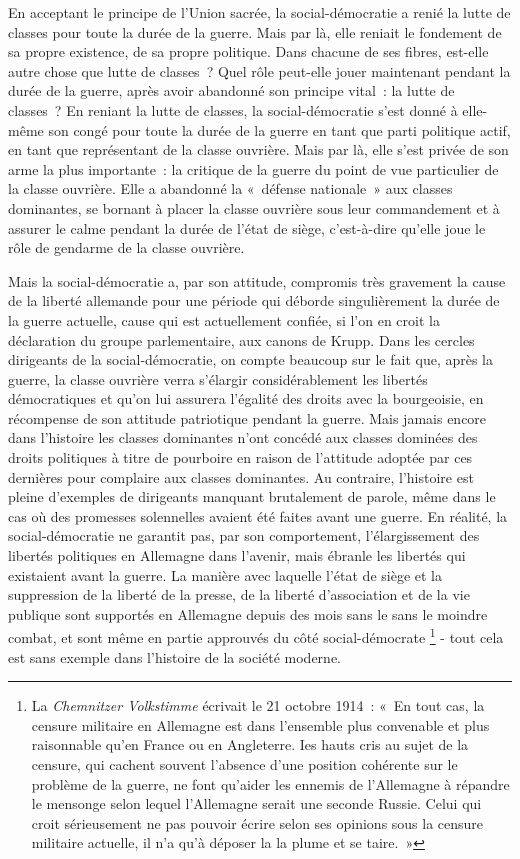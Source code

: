 \documentclass[french,twoside]{book} %
\begin{document}
En acceptant le principe de l’Union sacrée, la social-démocratie a renié la lutte de classes pour toute la durée de la guerre. Mais par là, elle reniait le fondement de sa propre existence, de sa propre politique. Dans chacune de ses fibres, est-elle autre chose que lutte de classes ? Quel rôle peut-elle jouer maintenant pendant la durée de la guerre, après avoir abandonné son principe vital : la lutte de classes ? En reniant la lutte de classes, la social-démocratie s’est donné à elle-même son congé pour toute la durée de la guerre en tant que parti politique actif, en tant que représentant de la classe ouvrière. Mais par là, elle s’est privée de son arme la plus importante : la critique de la guerre du point de vue particulier de la classe ouvrière. Elle a abandonné la « défense nationale » aux classes dominantes, se bornant à placer la classe ouvrière sous leur commandement et à assurer le calme pendant la durée de l’état de siège, c’est-à-dire qu’elle joue le rôle de gendarme de la classe ouvrière.\par
Mais la social-démocratie a, par son attitude, compromis très gravement la cause de la liberté allemande pour une période qui déborde singulièrement la durée de la guerre actuelle, cause qui est actuellement confiée, si l’on en croit la déclaration du groupe parlementaire, aux canons de Krupp. Dans les cercles dirigeants de la social-démocratie, on compte beaucoup sur le fait que, après la guerre, la classe ouvrière verra s’élargir considérablement les libertés démocratiques et qu’on lui assurera l’égalité des droits avec la bourgeoisie, en récompense de son attitude patriotique pendant la guerre. Mais jamais encore dans l’histoire les classes dominantes n’ont concédé aux classes dominées des droits politiques à titre de pourboire en raison de l’attitude adoptée par ces dernières pour complaire aux classes dominantes. Au contraire, l’histoire est pleine d’exemples de dirigeants manquant brutalement de parole, même dans le cas où des promesses solennelles avaient été faites avant une guerre. En réalité, la social-démocratie ne garantit pas, par son comportement, l’élargissement des libertés politiques en Allemagne dans l’avenir, mais ébranle les libertés qui existaient avant la guerre. La manière avec laquelle l’état de siège et la suppression de la liberté de la presse, de la liberté d’association et de la vie publique sont supportés en Allemagne depuis des mois sans le sans le moindre combat, et sont même en partie approuvés du côté social-démocrate \footnote{La \emph{Chemnitzer Volkstimme} écrivait le 21 octobre 1914 : « En tout cas, la censure militaire en Allemagne est dans l’ensemble plus convenable et plus raisonnable qu’en France ou en Angleterre. Ies hauts cris au sujet de la censure, qui cachent souvent l’absence d’une position cohérente sur le problème de la guerre, ne font qu’aider les ennemis de l’Allemagne à répandre le mensonge selon lequel l’Allemagne serait une seconde Russie. Celui qui croit sérieusement ne pas pouvoir écrire selon ses opinions sous la censure militaire actuelle, il n’a qu’à déposer la la plume et se taire. »} - tout cela est sans exemple dans l’histoire de la société moderne.\par
\end{document}
